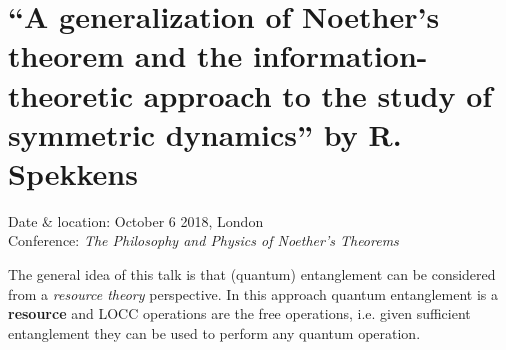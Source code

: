 \section{``A generalization of Noether's theorem and the information-theoretic approach to the study of symmetric dynamics'' by R. Spekkens}

    Date \& location: October 6 2018, London\\
    Conference: \textit{The Philosophy and Physics of Noether's Theorems}

    The general idea of this talk is that (quantum) entanglement can be considered from a \textit{resource theory} perspective. In this approach quantum entanglement is a \textbf{resource} and LOCC operations are the free operations, i.e. given sufficient entanglement they can be used to perform any quantum operation.